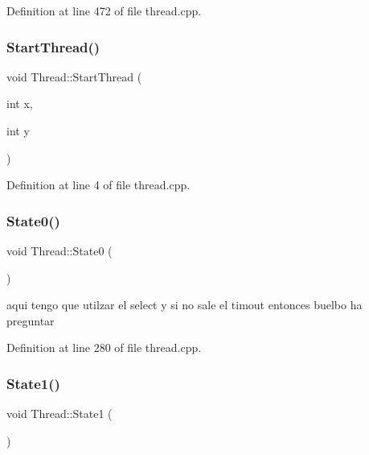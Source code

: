 Definition at line 472 of file thread.\+cpp.

\mbox{\label{class_thread_afc20a50819284acf6f225c0a1e8815a4}} 
\subsubsection{\texorpdfstring{Start\+Thread()}{StartThread()}}
{\footnotesize\ttfamily void Thread\+::\+Start\+Thread (\begin{DoxyParamCaption}\item[{int}]{x,  }\item[{int}]{y }\end{DoxyParamCaption})}



Definition at line 4 of file thread.\+cpp.

\mbox{\label{class_thread_a8aec2c879ec2f091a5a2c13479eb37ad}} 
\subsubsection{\texorpdfstring{State0()}{State0()}}
{\footnotesize\ttfamily void Thread\+::\+State0 (\begin{DoxyParamCaption}{ }\end{DoxyParamCaption})\hspace{0.3cm}{\ttfamily [private]}}

aqui tengo que utilzar el select y si no sale el timout entonces buelbo ha preguntar 

Definition at line 280 of file thread.\+cpp.

\mbox{\label{class_thread_ac8fa1a7c29e2c09fed3a16c49c59b32a}} 
\subsubsection{\texorpdfstring{State1()}{State1()}}
{\footnotesize\ttfamily void Thread\+::\+State1 (\begin{DoxyParamCaption}{ }\end{DoxyParamCaption})\hspace{0.3cm}{\ttfamily [private]}}



